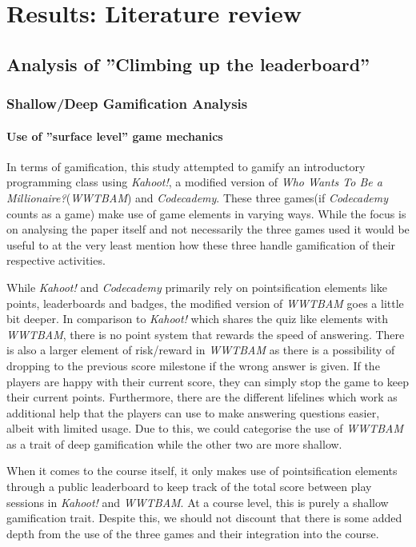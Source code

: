 \section{Results: Literature review}
\subsection{Analysis of ''Climbing up the leaderboard''}
\subsubsection{Shallow/Deep Gamification Analysis}
\paragraph{Use of ''surface level'' game mechanics}
In terms of gamification, this study attempted to gamify an introductory programming class using \emph{Kahoot!}, a modified version of \emph{Who Wants To Be a Millionaire?}(\emph{WWTBAM}) and \emph{Codecademy}. These three games(if \emph{Codecademy} counts as a game) make use of game elements in varying ways. While the focus is on analysing the paper itself and not necessarily the three games used it would be useful to at the very least mention how these three handle gamification of their respective activities.  

While \emph{Kahoot!} and \emph{Codecademy} primarily rely on pointsification elements like points, leaderboards and badges, the modified version of \emph{WWTBAM} goes a little bit deeper. In comparison to \emph{Kahoot!} which shares the quiz like elements with \emph{WWTBAM}, there is no point system that rewards the speed of answering. There is also a larger element of risk/reward in \emph{WWTBAM} as there is a possibility of dropping to the previous score milestone if the wrong answer is given. If the players are happy with their current score, they can simply stop the game to keep their current points. Furthermore, there are the different lifelines which work as additional help that the players can use to make answering questions easier, albeit with limited usage. Due to this, we could categorise the use of \emph{WWTBAM} as a trait of deep gamification while the other two are more shallow. 

When it comes to the course itself, it only makes use of pointsification elements through a public leaderboard to keep track of the total score between play sessions in \emph{Kahoot!} and \emph{WWTBAM}. At a course level, this is purely a shallow gamification trait. Despite this, we should not discount that there is some added depth from the use of the three games and their integration into the course. 


